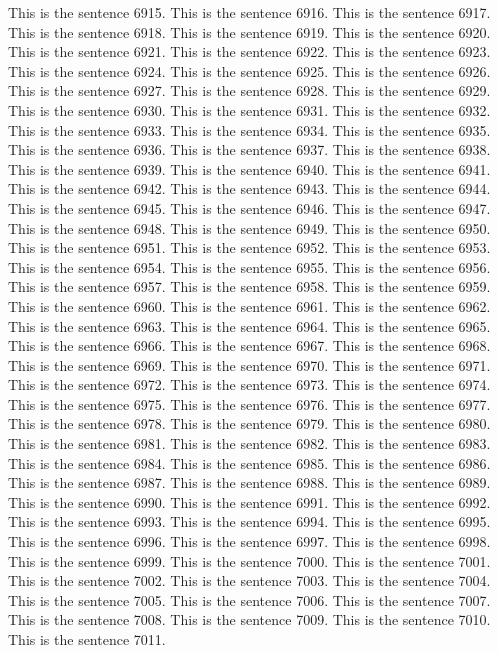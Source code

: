 \documentclass{article}
\begin{document}
This is the sentence 6915.
This is the sentence 6916.
This is the sentence 6917.
This is the sentence 6918.
This is the sentence 6919.
This is the sentence 6920.
This is the sentence 6921.
This is the sentence 6922.
This is the sentence 6923.
This is the sentence 6924.
This is the sentence 6925.
This is the sentence 6926.
This is the sentence 6927.
This is the sentence 6928.
This is the sentence 6929.
This is the sentence 6930.
This is the sentence 6931.
This is the sentence 6932.
This is the sentence 6933.
This is the sentence 6934.
This is the sentence 6935.
This is the sentence 6936.
This is the sentence 6937.
This is the sentence 6938.
This is the sentence 6939.
This is the sentence 6940.
This is the sentence 6941.
This is the sentence 6942.
This is the sentence 6943.
This is the sentence 6944.
This is the sentence 6945.
This is the sentence 6946.
This is the sentence 6947.
This is the sentence 6948.
This is the sentence 6949.
This is the sentence 6950.
This is the sentence 6951.
This is the sentence 6952.
This is the sentence 6953.
This is the sentence 6954.
This is the sentence 6955.
This is the sentence 6956.
This is the sentence 6957.
This is the sentence 6958.
This is the sentence 6959.
This is the sentence 6960.
This is the sentence 6961.
This is the sentence 6962.
This is the sentence 6963.
This is the sentence 6964.
This is the sentence 6965.
This is the sentence 6966.
This is the sentence 6967.
This is the sentence 6968.
This is the sentence 6969.
This is the sentence 6970.
This is the sentence 6971.
This is the sentence 6972.
This is the sentence 6973.
This is the sentence 6974.
This is the sentence 6975.
This is the sentence 6976.
This is the sentence 6977.
This is the sentence 6978.
This is the sentence 6979.
This is the sentence 6980.
This is the sentence 6981.
This is the sentence 6982.
This is the sentence 6983.
This is the sentence 6984.
This is the sentence 6985.
This is the sentence 6986.
This is the sentence 6987.
This is the sentence 6988.
This is the sentence 6989.
This is the sentence 6990.
This is the sentence 6991.
This is the sentence 6992.
This is the sentence 6993.
This is the sentence 6994.
This is the sentence 6995.
This is the sentence 6996.
This is the sentence 6997.
This is the sentence 6998.
This is the sentence 6999.
This is the sentence 7000.
This is the sentence 7001.
This is the sentence 7002.
This is the sentence 7003.
This is the sentence 7004.
This is the sentence 7005.
This is the sentence 7006.
This is the sentence 7007.
This is the sentence 7008.
This is the sentence 7009.
This is the sentence 7010.
This is the sentence 7011.
\end{document}
